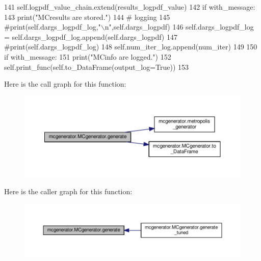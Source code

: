 \begin{DoxyCode}
141         self.logpdf\_value\_chain.extend(results\_logpdf\_value)
142         \textcolor{keywordflow}{if} with\_message:
143             print(\textcolor{stringliteral}{"MCresults are stored."})
144         \textcolor{comment}{# logging}
145         \textcolor{comment}{#print(self.dargs\_logpdf\_log,"\(\backslash\)n",self.dargs\_logpdf)}
146         self.dargs\_logpdf\_log = self.dargs\_logpdf\_log.append(self.dargs\_logpdf)
147         \textcolor{comment}{#print(self.dargs\_logpdf\_log)}
148         self.num\_iter\_log.append(num\_iter)
149         
150         \textcolor{keywordflow}{if} with\_message:
151             print(\textcolor{stringliteral}{"MCinfo are logged."})
152             self.print\_func(self.to\_DataFrame(output\_log=\textcolor{keyword}{True}))
153 
\end{DoxyCode}
Here is the call graph for this function\+:\nopagebreak
\begin{figure}[H]
\begin{center}
\leavevmode
\includegraphics[width=350pt]{d3/dad/classmcgenerator_1_1MCgenerator_a660b1c6c2600d3cefc77690838c755b5_cgraph}
\end{center}
\end{figure}
Here is the caller graph for this function\+:\nopagebreak
\begin{figure}[H]
\begin{center}
\leavevmode
\includegraphics[width=350pt]{d3/dad/classmcgenerator_1_1MCgenerator_a660b1c6c2600d3cefc77690838c755b5_icgraph}
\end{center}
\end{figure}
\mbox{\label{classmcgenerator_1_1MCgenerator_ad6c5b6846464112f7ade3d6ca197e6d2}} 
